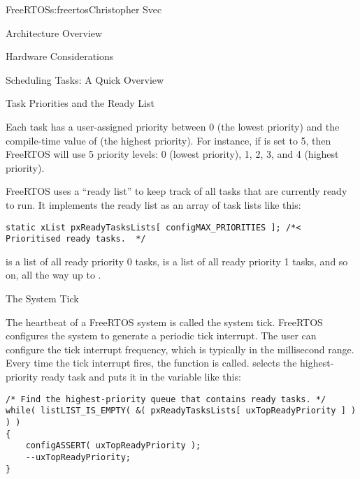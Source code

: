 \begin{aosachapter}{FreeRTOS}{s:freertos}{Christopher Svec}
\begin{aosasect1}{Architecture Overview}
\begin{aosasect2}{Hardware Considerations}
\end{aosasect2}

\end{aosasect1}

\begin{aosasect1}{Scheduling Tasks: A Quick Overview}


\begin{aosasect2}{Task Priorities and the Ready List}

Each task has a user-assigned priority between 0 (the lowest priority)
and the compile-time value of  (the
highest priority). For instance, if  is
set to 5, then FreeRTOS will use 5 priority levels: 0 (lowest
priority), 1, 2, 3, and 4 (highest priority).

FreeRTOS uses a ``ready list'' to keep track of all tasks that are
currently ready to run. It implements the ready list as an array of
task lists like this:

\begin{verbatim}
static xList pxReadyTasksLists[ configMAX_PRIORITIES ]; /*< Prioritised ready tasks.  */
\end{verbatim}

\noindent {} is a list of all ready priority 0 tasks,
 is a list of all ready priority 1 tasks,
and so on, all the way up to
.

\end{aosasect2}

\begin{aosasect2}{The System Tick}

The heartbeat of a FreeRTOS system is called the system tick. FreeRTOS
configures the system to generate a periodic tick interrupt. The user
can configure the tick interrupt frequency, which is typically in the
millisecond range.  Every time the tick interrupt fires, the
 function is called.
 selects the highest-priority ready task
and puts it in the  variable like this:

\begin{verbatim}
/* Find the highest-priority queue that contains ready tasks. */
while( listLIST_IS_EMPTY( &( pxReadyTasksLists[ uxTopReadyPriority ] ) ) )
{
    configASSERT( uxTopReadyPriority );
    --uxTopReadyPriority;
}


\end{verbatim}
\end{aosasect2}
\end{aosasect1}
\end{aosachapter}
